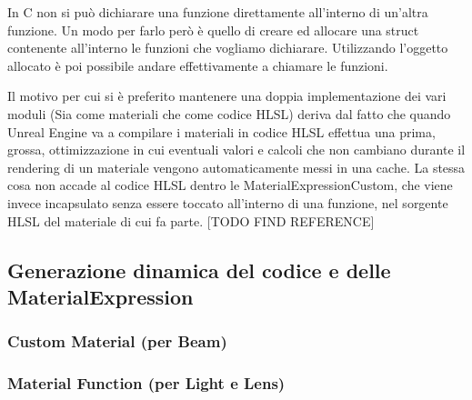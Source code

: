\documentclass[main.tex]{subfiles}
\begin{document}
In C non si può dichiarare una funzione direttamente all'interno di un'altra funzione. Un modo per farlo però è quello di creare ed allocare una struct contenente all'interno le funzioni che vogliamo dichiarare. Utilizzando l'oggetto allocato è poi possibile andare effettivamente a chiamare le funzioni.

Il motivo per cui si è preferito mantenere una doppia implementazione dei vari moduli (Sia come materiali che come codice HLSL) deriva dal fatto che quando Unreal Engine va a compilare i materiali in codice HLSL effettua una prima, grossa, ottimizzazione in cui eventuali valori e calcoli che non cambiano durante il rendering di un materiale vengono automaticamente messi in una cache. La stessa cosa non accade al codice HLSL dentro le MaterialExpressionCustom, che viene invece incapsulato senza essere toccato all'interno di una funzione, nel sorgente HLSL del materiale di cui fa parte. [TODO FIND REFERENCE]

\subsection{Generazione dinamica del codice e delle MaterialExpression}\label{subsec:2_codeGeneration}
\subsubsection{Custom Material (per Beam)}\label{subsec:2_3_CM}
\subsubsection{Material Function (per Light e Lens)}\label{subsec:2_3_MF}
\end{document}
